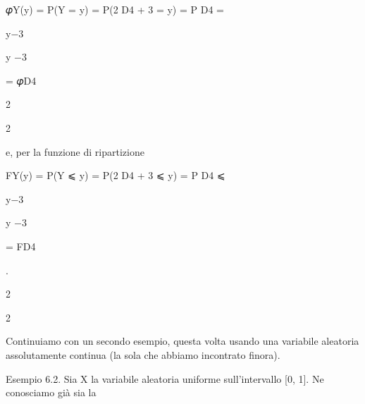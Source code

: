 \documentclass[a4paper,portrait,12pt]{article}
\begin{document}
\begin{flushleft}
𝜑Y(y) = P(Y = y) = P(2 D4 + 3 = y) = P D4 =
\end{flushleft}





\begin{flushleft}
y$-$3
\end{flushleft}


\begin{flushleft}
y $-$3
\end{flushleft}


\begin{flushleft}
= 𝜑D4
\end{flushleft}


2


2





\begin{flushleft}
e, per la funzione di ripartizione
\end{flushleft}


\begin{flushleft}
FY(y) = P(Y ⩽ y) = P(2 D4 + 3 ⩽ y) = P D4 ⩽
\end{flushleft}





\begin{flushleft}
y$-$3
\end{flushleft}


\begin{flushleft}
y $-$3
\end{flushleft}


\begin{flushleft}
= FD4
\end{flushleft}


.


2


2





\begin{flushleft}
Continuiamo con un secondo esempio, questa volta usando una variabile aleatoria assolutamente continua (la sola che abbiamo incontrato finora).
\end{flushleft}


\begin{flushleft}
Esempio 6.2. Sia X la variabile aleatoria uniforme sull'intervallo [0, 1]. Ne conosciamo gi\`{a} sia la
\end{flushleft}
\end{document}
